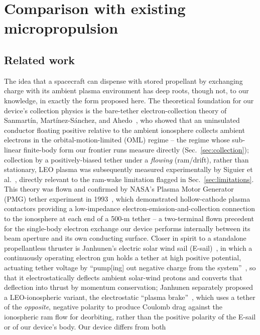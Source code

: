 \documentclass[11pt]{article}
\begin{document}
\section{Comparison with existing micropropulsion}
\label{sec:comparison}

\subsection{Related work}
\label{sec:related}
The idea that a spacecraft can dispense with stored propellant by exchanging
charge with its ambient plasma environment has deep roots, though not, to our
knowledge, in exactly the form proposed here. The theoretical foundation for
our device's collection physics is the bare-tether electron-collection theory
of Sanmart\'in, Mart\'inez-S\'anchez, and Ahedo~\cite{san93}, who showed that
an uninsulated conductor floating positive relative to the ambient ionosphere
collects ambient electrons in the orbital-motion-limited (OML) regime -- the
regime whose sub-linear finite-body form our frontier runs measure directly
(Sec.~\ref{sec:collection}); collection by a positively-biased tether under
a \emph{flowing} (ram/drift), rather than stationary, LEO plasma was
subsequently measured experimentally by Siguier et al.~\cite{sig13}, directly
relevant to the ram-wake limitation flagged in Sec.~\ref{sec:limitations}.
This theory was flown and confirmed by NASA's Plasma Motor Generator (PMG)
tether experiment in 1993~\cite{pmg93,kat95}, which demonstrated
hollow-cathode plasma contactors providing a low-impedance
electron-emission-and-collection connection to the ionosphere at each end of
a 500-m tether -- a two-terminal flown precedent for the single-body electron
exchange our device performs internally between its beam aperture and its
own conducting surface. Closer in spirit to a standalone propellantless
thruster is Janhunen's electric solar wind sail
(E-sail)~\cite{jan04}, in which a continuously operating electron gun holds a
tether at high positive potential, actuating tether voltage by ``pump[ing]
out negative charge from the system''~\cite{jan14}, so that it electrostatically
deflects ambient solar-wind protons and converts that deflection into thrust
by momentum conservation; Janhunen separately proposed a LEO-ionospheric
variant, the electrostatic ``plasma brake''~\cite{jan10,jan09neg}, which uses a
tether of the \emph{opposite}, negative polarity to produce Coulomb drag
against the ionospheric ram flow for deorbiting, rather than the positive
polarity of the E-sail or of our device's body. Our device differs from both
\end{document}
